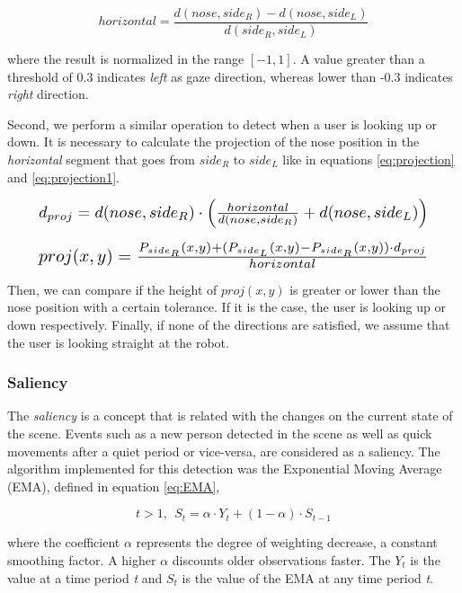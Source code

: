 \documentclass[a4paper, 10pt, conference]{ieeeconf}      %
\begin{document}
\begin{equation} \label{eq:estwest}
horizontal = \frac{d(nose,side_R)-d(nose,side_L)}{d(side_R,side_L)}
\end{equation}

where the result is normalized in the range $ [-1,1] $. A value greater than a threshold of 0.3 indicates \textit{left} as gaze direction, whereas lower than -0.3 indicates \textit{right} direction.

Second, we perform a similar operation to detect when a user is looking up or down. It is necessary to calculate the projection of the nose position in the \textit{horizontal} segment that goes from $ side_R $ to $side_L$ like in equations \ref{eq:projection} and \ref{eq:projection1}.

\begin{equation}\label{eq:projection}
\resizebox{.9\hsize}{!}{$d_{proj} = d(nose,side_R) \cdot \left(\frac{horizontal}{d(nose,side_R)} + d(nose,side_L)\right )$}
\end{equation}

\begin{equation} \label{eq:projection1}
\resizebox{.9\hsize}{!}{$proj(x,y) = \frac{P_{side_R}(x,y)+(P_{side_L}(x,y)-P_{side_R}(x,y))\cdot d_{proj}}{horizontal}$}
\end{equation}

Then, we can compare if the height of $ proj(x,y) $ is greater or lower than the nose position with a certain tolerance. If it is the case, the user is looking up or down respectively. Finally, if none of the directions are satisfied, we assume that the user is looking straight at the robot.


\subsubsection{Saliency}
The \textit{saliency} is a concept that is related with the changes on the current state of the scene. Events such as a new person detected in the scene as well as quick movements after a quiet period or vice-versa, are considered as a saliency. The algorithm implemented for this detection was the Exponential Moving Average (EMA), defined in equation \ref{eq:EMA},

\begin{equation} \label{eq:EMA}
 t > 1,\ \    S_{t} = \alpha \cdot Y_{t} + (1-\alpha) \cdot S_{t-1}
\end{equation}

where the coefficient $ \alpha $ represents the degree of weighting decrease, a constant smoothing factor. A higher $ \alpha $ discounts older observations faster. The $ Y_t $ is the value at a time period \textit{t} and $ S_t $ is the value of the EMA at any time period \textit{t}.
\end{document}
